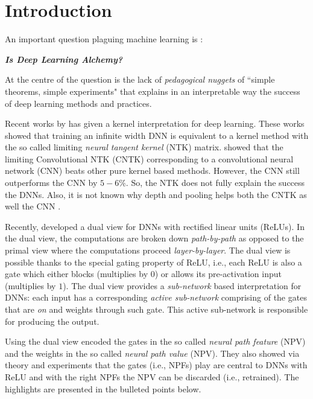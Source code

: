 \section{Introduction}\label{sec:intro}
An important question plaguing machine learning is \cite{BenAli-1,Lecun,BenAli-2,Aliresponse,Mickens}:
\begin{center} 
\textbf{\emph{Is Deep Learning Alchemy?}}
 \end{center}
At the centre of the question is the lack of \emph{pedagogical nuggets} of ``simple theorems, simple experiments" \cite{Aliresponse} that explains in an interpretable way the success of deep learning methods and practices.

Recent works by \cite{arora2019exact, ntk,cao2019generalization} has given a kernel interpretation for deep learning. These works showed that training an infinite width DNN is equivalent to a kernel method with the so called limiting \emph{neural tangent kernel} (NTK) matrix. \cite{arora2019exact} showed that the limiting Convolutional NTK (CNTK) corresponding to a convolutional neural network (CNN) beats other pure kernel based methods. However, the CNN still outperforms the CNN by $5-6\%$. So, the NTK does not fully explain the success the DNNs. Also, it is not known why depth and pooling helps both the CNTK as well the CNN \cite{arora2019exact}.

Recently, \cite{npk} developed a dual view for DNNs with rectified linear units (ReLUs). In the dual view, the computations are broken down \emph{path-by-path} as opposed to the primal view where the computations proceed \emph{layer-by-layer}. The dual view is possible thanks to the special gating property of ReLU, i.e., each ReLU is also a gate which either blocks (multiplies by $0$) or allows its pre-activation input (multiplies by $1$). The dual view provides a \emph{sub-network} based interpretation for DNNs: each input has a corresponding \emph{active sub-network} comprising of the gates that are \emph{on} and weights through such gate. This active sub-network is responsible for producing the output. 

Using the dual view \cite{npk} encoded the gates in the so called \emph{neural path feature} (NPV) and the weights in the so called \emph{neural path value} (NPV). They also showed via  theory and experiments that the gates (i.e., NPFs) play are central to DNNs with ReLU and with the right NPFs the NPV can be discarded (i.e., retrained). The highlights are presented in the bulleted points below.

